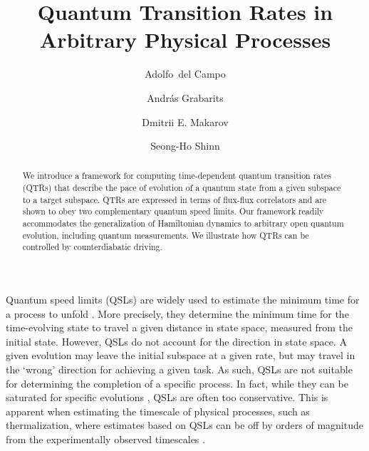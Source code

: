 \documentclass[prl,aps,amssymb,twocolumn,superscriptaddress, notitlepage, longbibliography]{revtex4-2}
\begin{document}
\title{Quantum Transition Rates in Arbitrary Physical Processes}


\author{Adolfo~del Campo}

\author{Andr\'as Grabarits }

\author{Dmitrii E. Makarov}

\author{Seong-Ho Shinn  }






\begin{abstract}
We introduce a framework for computing time-dependent quantum transition rates (QTRs) that describe the pace of evolution of a quantum state from a given subspace to a target subspace. QTRs are expressed in terms of flux-flux correlators and are shown to obey two complementary quantum speed limits. Our framework readily accommodates the generalization of Hamiltonian dynamics to arbitrary open quantum evolution,
including quantum measurements. We illustrate how QTRs can be controlled by counterdiabatic driving.
\end{abstract}


\maketitle


Quantum speed limits (QSLs) are widely used to estimate the minimum time for a process to unfold \cite{Mandelstam45,Margolus98,Deffner2017,Gong22}. More precisely, they determine the minimum time for the time-evolving state to travel a given distance in state space, measured from the initial state. However, QSLs do not account for the direction in state space. A given evolution may leave the initial subspace at a given rate, but may travel in the `wrong' direction for achieving a given task. As such, QSLs are not suitable for determining the completion of a specific process.  In fact, while they can be saturated for specific evolutions \cite{Margolus98,Giovannetti2003,Levitin2009,Campaioli2018,Campaioli2019}, QSLs are often too conservative. This is apparent when estimating the timescale of physical processes, such as thermalization, where estimates based on QSLs can be off by orders of magnitude from the experimentally observed timescales \cite{Gogolin16,Gong22}.
\end{document}
